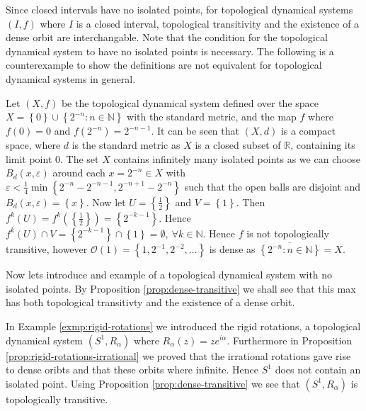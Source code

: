 Since closed intervals have no isolated points, for topological dynamical systems $(I, f)$ where $I$ is a closed interval, topological transitivity and the existence of a dense orbit are interchangable. Note that the condition for the topological dynamical system to have no isolated points is necessary. The following is a counterexample to show the definitions are not equivalent for topological dynamical systems in general.

\begin{exmp} \label{exmp:dense-orbit-not-equal-transitive}
    Let $(X, f)$ be the topological dynamical system defined over the space $X = \left\lbrace 0 \right\rbrace \cup \left\lbrace 2^{-n} : n \in \mathbb{N} \right\rbrace$ with the standard metric, and the map $f$ where $f(0) = 0$ and $f(2^{-n}) = 2^{-n-1}$. It can be seen that $(X, d)$ is a compact space, where $d$ is the standard metric as $X$ is a closed subset of $\mathbb{R}$, containing its limit point $0$. The set $X$ contains infinitely many isolated points as we can choose $B_d(x, \varepsilon)$ around each $x = 2^{-n} \in X$ with $\varepsilon < \frac{1}{4} \min\left\lbrace 2^{-n} - 2^{-n-1}, 2^{-n + 1} - 2^{-n} \right\rbrace$ such that the open balls are disjoint and $B_d(x, \varepsilon) = \left\lbrace x \right\rbrace$. Now let $U = \left\lbrace \frac{1}{2} \right\rbrace$ and $V = \left\lbrace 1 \right\rbrace$. Then $f^k(U) = f^k(\left\lbrace \frac{1}{2} \right\rbrace) = \left\lbrace 2^{-k-1} \right\rbrace$. Hence $f^k(U) \cap V = \left\lbrace 2^{-k-1} \right\rbrace \cap \left\lbrace 1 \right\rbrace = \emptyset, \ \forall k \in \mathbb{N}$. Hence $f$ is not topologically transitive, however $\mathcal{O}(1) = \left\lbrace 1, 2^{-1}, 2^{-2}, \dots \right\rbrace$ is dense as $\overline{\left\lbrace2^{-n}: n \in \mathbb{N}\right\rbrace} = X$.
\end{exmp}

Now lets introduce and example of a topological dynamical system with no isolated points. By Proposition \ref{prop:dense-transitive} we shall see that this max has both topological transitivty and the existence of a dense orbit.

\begin{exmp} \label{exmp:dense-orbit-and-transitive}
    In Example \ref{exmp:rigid-rotations} we introduced the rigid rotations, a topological dynamical system $(S^1, R_\alpha)$ where $R_{\alpha}(z) = ze^{i\alpha}$. Furthermore in Proposition \ref{prop:rigid-rotations-irrational} we proved that the irrational rotations gave rise to dense oribts and that these orbits where infinite. Hence $S^1$ does not contain an isolated point. Using Proposition \ref{prop:dense-transitive} we see that $(S^1, R_\alpha)$ is topologically transitive.
\end{exmp}

